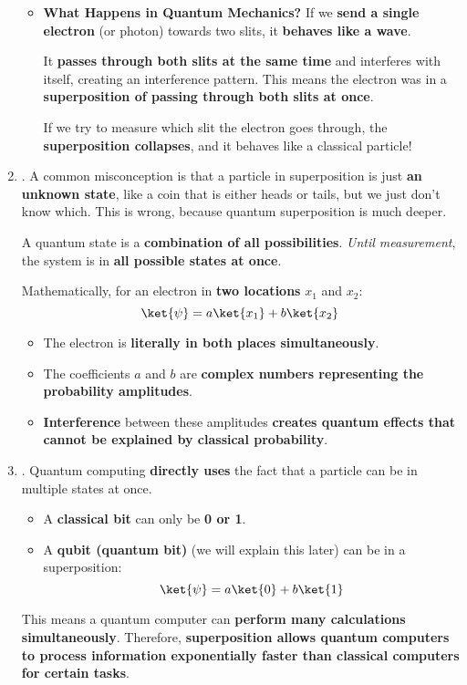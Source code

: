 \begin{enumerate}
\begin{itemize}[label=\textcolor{Green3}{}]
    \item \textcolor{Green3}{\textbf{What Happens in Quantum Mechanics?}} If we \textbf{send a single electron} (or photon) towards two slits, it \textbf{behaves like a wave}.

    It \textbf{passes through both slits at the same time} and interferes with itself, creating an interference pattern. This means the electron was in a \textbf{superposition of passing through both slits at once}.

    If we try to measure which slit the electron goes through, the \textbf{superposition collapses}, and it behaves like a classical particle!
  \end{itemize}


  \item {}. A common misconception is that a particle in superposition is just \textbf{an unknown state}, like a coin that is either heads or tails, but we just don't know which. This is wrong, because quantum superposition is much deeper.

  A quantum state is a \textbf{combination of all possibilities}. \emph{Until measurement}, the system is in \textbf{all possible states at once}.
  
  Mathematically, for an electron in \textbf{two locations} $x_{1}$ and $x_{2}$:
  \begin{equation*}
    \ket{\psi} = a \ket{x_{1}} + b \ket{x_{2}}
  \end{equation*}
  \begin{itemize}
    \item The electron is \textbf{literally in both places simultaneously}.
    \item The coefficients $a$ and $b$ are \textbf{complex numbers representing the probability amplitudes}.
    \item \textbf{Interference} between these amplitudes \textbf{creates quantum effects that cannot be explained by classical probability}.
  \end{itemize}


  \item {}. Quantum computing \textbf{directly uses} the fact that a particle can be in multiple states at once.

  \begin{itemize}
    \item A \textbf{classical bit} can only be \textbf{0 or 1}.
    \item A \textbf{qubit (quantum bit)} (we will explain this later) can be in a superposition:
    \begin{equation*}
      \ket{\psi} = a \ket{0} + b \ket{1}
    \end{equation*}
  \end{itemize}
  This means a quantum computer can \textbf{perform many calculations simultaneously}. Therefore, \textbf{superposition allows quantum computers to process information exponentially faster than classical computers for certain tasks}.


\end{enumerate}
